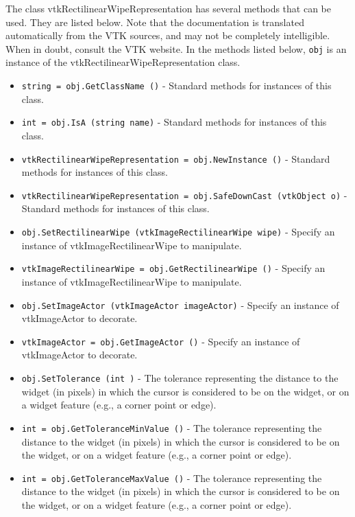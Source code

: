 The class vtkRectilinearWipeRepresentation has several methods that can be used.
  They are listed below.
Note that the documentation is translated automatically from the VTK sources,
and may not be completely intelligible.  When in doubt, consult the VTK website.
In the methods listed below, \verb|obj| is an instance of the vtkRectilinearWipeRepresentation class.
\begin{itemize}
\item  \verb|string = obj.GetClassName ()| -  Standard methods for instances of this class.

\item  \verb|int = obj.IsA (string name)| -  Standard methods for instances of this class.

\item  \verb|vtkRectilinearWipeRepresentation = obj.NewInstance ()| -  Standard methods for instances of this class.

\item  \verb|vtkRectilinearWipeRepresentation = obj.SafeDownCast (vtkObject o)| -  Standard methods for instances of this class.

\item  \verb|obj.SetRectilinearWipe (vtkImageRectilinearWipe wipe)| -  Specify an instance of vtkImageRectilinearWipe to manipulate.

\item  \verb|vtkImageRectilinearWipe = obj.GetRectilinearWipe ()| -  Specify an instance of vtkImageRectilinearWipe to manipulate.

\item  \verb|obj.SetImageActor (vtkImageActor imageActor)| -  Specify an instance of vtkImageActor to decorate.

\item  \verb|vtkImageActor = obj.GetImageActor ()| -  Specify an instance of vtkImageActor to decorate.

\item  \verb|obj.SetTolerance (int )| -  The tolerance representing the distance to the widget (in pixels)
 in which the cursor is considered to be on the widget, or on a
 widget feature (e.g., a corner point or edge).

\item  \verb|int = obj.GetToleranceMinValue ()| -  The tolerance representing the distance to the widget (in pixels)
 in which the cursor is considered to be on the widget, or on a
 widget feature (e.g., a corner point or edge).

\item  \verb|int = obj.GetToleranceMaxValue ()| -  The tolerance representing the distance to the widget (in pixels)
 in which the cursor is considered to be on the widget, or on a
 widget feature (e.g., a corner point or edge).


\end{itemize}
